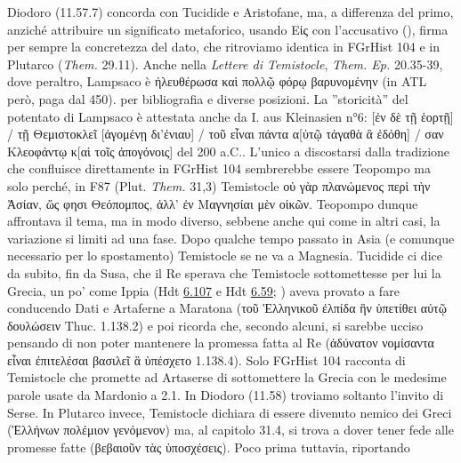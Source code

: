 {             Diodoro (11.57.7) concorda con Tucidide e Aristofane, ma, a differenza del primo, anziché attribuire un significato metaforico, usando \textgreek{Εἰς} con l'accusativo (\cite[537]{Marr1996}), firma per sempre la concretezza  del dato, che ritroviamo identica in FGrHist 104 e in Plutarco (\emph{Them.}  29.11). Anche nella \emph{Lettere di Temistocle}, \emph{Them. Ep.}  20.35-39,  dove peraltro, Lampsaco è \textgreek{ἠλευθέρωσα καὶ πολλῷ φόρῳ βαρυνομένην} (in ATL però, paga dal 450). \cite[262 e n.20]{CulassoGastaldi1990} per bibliografia e diverse posizioni. La ''storicità''  del potentato di Lampsaco è attestata anche da I. aus Kleinasien n°6: \textgreek{[ἐν δὲ τῇ ἑορτῇ] / τῇ Θεμιστοκλεῖ [ἀγομένῃ δι'ἐνιαυ] / τοῦ εἶναι πάντα α[ὐτῷ τἀγαθὰ ἃ ἐδόθη] / σαν Κλεοφάντῳ κ[αὶ τοῖς ἀπογόνοις]} del 200 a.C..  L'unico a discostarsi dalla tradizione che confluisce direttamente in FGrHist 104 sembrerebbe essere Teopompo  ma solo perché, in F87 (Plut. \emph{Them.}  31,3) Temistocle \textgreek{οὐ γὰρ πλανώμενος περὶ τὴν Ἀσίαν, ὥς φησι Θεόπομπος, ἀλλ’ ἐν Μαγνησίαι μὲν οἰκῶν}. Teopompo  dunque affrontava il tema, ma in modo diverso, sebbene anche qui come in altri casi, la variazione si limiti ad una fase. Dopo qualche tempo passato in Asia (e comunque necessario per lo spostamento) Temistocle se ne va a Magnesia. Tucidide ci dice da subito, fin da Susa, che il Re sperava che Temistocle sottomettesse per lui la Grecia, un po' come Ippia  (Hdt \href{http://data.perseus.org/citations/urn:cts:greekLit:tlg0016.tlg001.perseus-grc1:6.107}{6.107} e Hdt \href{http://data.perseus.org/citations/urn:cts:greekLit:tlg0016.tlg001.perseus-grc1:6.59}{6.59}; \cite[25]{Cagnazzi2001}) aveva provato a fare conducendo Dati e Artaferne a Maratona (\textgreek{τοῦ Ἑλληνικοῦ ἐλπίδα ἣν ὑπετίθει αὐτῷ δουλώσειν} Thuc. 1.138.2) e poi ricorda che, secondo alcuni, si sarebbe ucciso pensando di non poter mantenere la promessa fatta al Re (\textgreek{ἀδύνατον νομίσαντα εἶναι ἐπιτελέσαι βασιλεῖ ἃ ὑπέσχετο} 1.138.4).\label{ref:promessaditemistocleeierone} Solo FGrHist 104 racconta di Temistocle che promette ad Artaserse  di sottomettere la Grecia con le medesime parole usate da Mardonio a 2.1. In  Diodoro (11.58) troviamo soltanto l'invito di Serse. In Plutarco invece, Temistocle dichiara di essere divenuto nemico dei Greci (\textgreek{Ἑλλήνων πολέμιον γενόμενον}) ma, al capitolo 31.4, si trova a dover tener fede alle promesse fatte (\textgreek{βεβαιοῦν τὰς ὑποσχέσεις}). Poco prima tuttavia, riportando }
